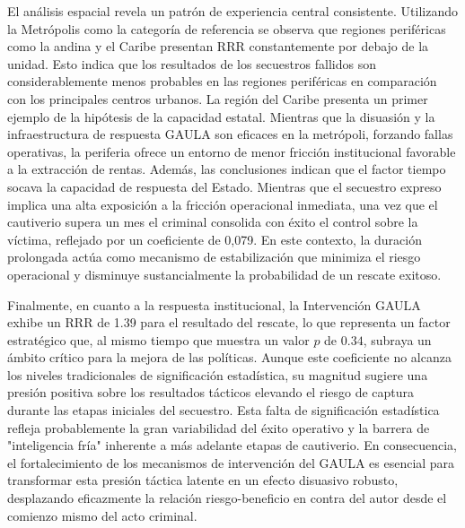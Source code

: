 \documentclass[12pt]{article}
\theoremstyle{definition}
\theoremstyle{remark}
\newcommand{\1}{\mathbf{1}}
\begin{document}
El análisis espacial revela un patrón de experiencia central consistente. Utilizando la Metrópolis como la categoría de referencia se observa que regiones periféricas como la andina y el Caribe presentan RRR constantemente por debajo de la unidad. Esto indica que los resultados de los secuestros fallidos son considerablemente menos probables en las regiones periféricas en comparación con los principales centros urbanos. La región del Caribe presenta un primer ejemplo de la hipótesis de la capacidad estatal. Mientras que la disuasión y la infraestructura de respuesta GAULA son eficaces en la metrópoli, forzando fallas operativas, la periferia ofrece un entorno de menor fricción institucional favorable a la extracción de rentas. Además, las conclusiones indican que el factor tiempo socava la capacidad de respuesta del Estado. Mientras que el secuestro expreso implica una alta exposición a la fricción operacional inmediata, una vez que el cautiverio supera un mes el criminal consolida con éxito el control sobre la víctima, reflejado por un coeficiente de 0,079. En este contexto, la duración prolongada actúa como mecanismo de estabilización que minimiza el riesgo operacional y disminuye sustancialmente la probabilidad de un rescate exitoso.

Finalmente, en cuanto a la respuesta institucional, la Intervención GAULA exhibe un RRR de 1.39 para el resultado del rescate, lo que representa un factor estratégico que, al mismo tiempo que muestra un valor $p$ de $0.34$, subraya un ámbito crítico para la mejora de las políticas. Aunque este coeficiente no alcanza los niveles tradicionales de significación estadística, su magnitud sugiere una presión positiva sobre los resultados tácticos elevando el riesgo de captura durante las etapas iniciales del secuestro. Esta falta de significación estadística refleja probablemente la gran variabilidad del éxito operativo y la barrera de "inteligencia fría" inherente a más adelante etapas de cautiverio. En consecuencia, el fortalecimiento de los mecanismos de intervención del GAULA es esencial para transformar esta presión táctica latente en un efecto disuasivo robusto, desplazando eficazmente la relación riesgo-beneficio en contra del autor desde el comienzo mismo del acto criminal.
\end{document}
